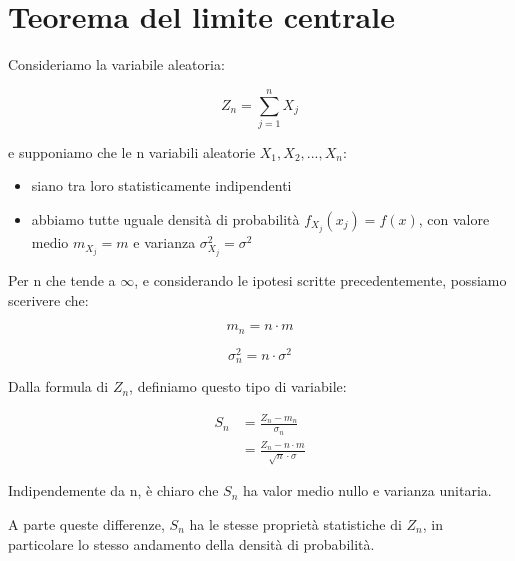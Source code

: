 \newpage 

\section{Teorema del limite centrale} 

Consideriamo la variabile aleatoria: 

{
    \Large 
    \begin{equation}
        Z_n = \sum_{j = 1}^{n} X_j
    \end{equation}
}


e supponiamo che le n variabili aleatorie $X_1, X_2, ..., X_n$: 

\begin{itemize}
    \item siano tra loro statisticamente indipendenti 
    \item abbiamo tutte uguale densità di probabilità $f_{X_j} (x_j) = f(x)$, con valore medio $m_{X_j} = m$ e varianza $\sigma_{X_j} ^{2} = \sigma ^{2}$
\end{itemize}

Per n che tende a $\infty$, e considerando le ipotesi scritte precedentemente, possiamo scerivere che: 

{
    \Large 
    \begin{equation}
        m_n = n \cdot m
    \end{equation}
}

{
    \Large 
    \begin{equation}
        \sigma_n ^{2} = n \cdot \sigma^{2}
    \end{equation}
}

Dalla formula di $Z_n$, definiamo questo tipo di variabile: 

{
    \Large
    \begin{equation}
        \begin{split}
            S_n 
            &= 
            \frac{Z_n - m_n}{\sigma_n}
            \\ 
            &= 
            \frac{Z_n - n \cdot m}{\sqrt{n} \cdot \sigma}
        \end{split}
    \end{equation}
}

Indipendemente da n, è chiaro che $S_n$ ha valor medio nullo e varianza unitaria. \newline 

A parte queste differenze, $S_n$ ha le stesse proprietà statistiche di $Z_n$, in particolare lo stesso andamento della densità di probabilità. \newline 

